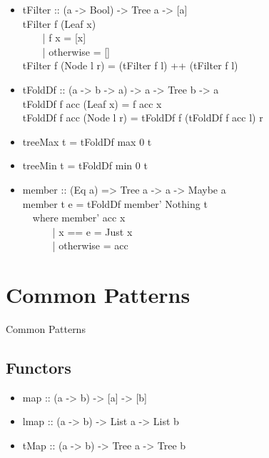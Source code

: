 \documentclass{beamer}                  %
\newcommand{\srule}{
	\rule{\textwidth}{1pt}\\
}
\newlength{\subsecwidth}
\newenvironment{slide}{
	\begin{frame} %
	\settowidth{\subsecwidth}{\insertsubsection} %
	\ifthenelse{\dimtest{\subsecwidth}{<}{1pt}}{ %
		\frametitle{\insertsection\\             %
		\vspace{-1ex}                            %
		\color{fore}\srule                       %
		\par                                     %
		\vspace{-3ex}                            %
		}
	}{                                           %
		\frametitle{\insertsection\ -- \insertsubsection\\ %
		\vspace{-1ex}                            %
		\color{fore}\srule                       %
		\par                                     %
		\vspace{-3ex}                            %
		}
	}
	\Large                                       %
}{
	\end{frame}
}
\newcommand{\titleslide}[1]{
	\section{#1}             %
	\begin{slide}
		\begin{center}
			\color{comments}
			\Huge            %
			#1               %
		\end{center}
	\end{slide}
}
\begin{document}
\begin{slide}
  \begin{itemize}
    \item
      tFilter :: (a -> Bool) -> Tree a -> [a]\\
      tFilter f (Leaf x)\\
      ~~~~| f x = [x]\\
      ~~~~| otherwise = []\\
      tFilter f (Node l r) = (tFilter f l) ++ (tFilter f l)
  \end{itemize}
\end{slide}

\begin{slide}
  \begin{itemize}
    \item
      tFoldDf :: (a -> b -> a) -> a -> Tree b -> a\\
      tFoldDf f acc (Leaf x)   = f acc x\\
      tFoldDf f acc (Node l r) = tFoldDf f (tFoldDf f acc l) r
    \item treeMax t = tFoldDf max 0 t
    \item treeMin t = tFoldDf min 0 t
  \end{itemize}
\end{slide}

\begin{slide}
  \begin{itemize}
    \item
      member :: (Eq a) => Tree a -> a -> Maybe a\\
      member t e = tFoldDf member' Nothing t\\
      ~~where member' acc x\\
      ~~~~~~| x == e    = Just x\\
      ~~~~~~| otherwise = acc

  \end{itemize}
\end{slide}

\titleslide{Common Patterns}
\subsection{Functors}

\begin{slide}
  \begin{itemize}
    \item map :: (a -> b) -> [a] -> [b]
    \item lmap :: (a -> b) -> List a -> List b
    \item tMap :: (a -> b) -> Tree a -> Tree b
  \end{itemize}
\end{slide}
\end{document}
